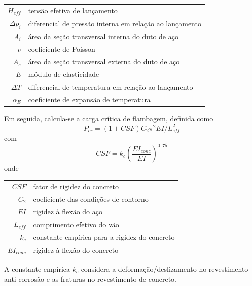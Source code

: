 \begin{tabular}{rl}
$H_\mathit{eff}$ & tensão efetiva de lançamento\\
$\Delta p_i$     & diferencial de pressão interna em relação ao lançamento\\
$A_i$            & área da seção transversal interna do duto de aço\\
$\nu$            & coeficiente de Poisson\\
$A_s$            & área da seção transversal externa do duto de aço\\
$E$              & módulo de elasticidade\\
$\Delta T$       & diferencial de temperatura em relação ao lançamento\\
$\alpha_E$       & coeficiente de expansão de temperatura
\end{tabular}

Em seguida, calcula-se a carga crítica de flambagem, definida como
\begin{equation}
\label{eq:viv-Pcr}
P_\mathit{cr} = (1 + \mathit{CSF}) C_2\pi^2 \mathit{EI}/L_\mathit{eff}^2
\end{equation}
com
\begin{equation}
\label{eq:viv-CSF}
\mathit{CSF} = k_c {\left(\frac{\mathit{EI}_\mathit{conc}}{\mathit{EI}}\right)}^{0,75}
\end{equation}
onde

\begin{tabular}{rl}
	$\mathit{CSF}$               & fator de rigidez do concreto\\
	$C_2$                        & coeficiente das condições de contorno\\
	$\mathit{EI}$                & rigidez à flexão do aço\\
	$L_\mathit{eff}$             & comprimento efetivo do vão\\
	$k_c$                        & constante empírica para a rigidez do concreto\\
	$\mathit{EI}_\mathit{conc}$  & rigidez à flexão do concreto
\end{tabular}

A constante empírica $k_c$ considera a deformação/deslizamento no revestimento anti-corrosão e as fraturas no revestimento de concreto.

